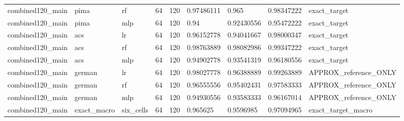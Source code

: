 \begin{tabular}{lllllllll}
combined120\_main & pima & rf & 64 & 120 & 0.97486111 & 0.965 & 0.98347222 & exact\_target \\
combined120\_main & pima & mlp & 64 & 120 & 0.94 & 0.92430556 & 0.95472222 & exact\_target \\
combined120\_main & acs & lr & 64 & 120 & 0.96152778 & 0.94041667 & 0.98000347 & exact\_target \\
combined120\_main & acs & rf & 64 & 120 & 0.98763889 & 0.98082986 & 0.99347222 & exact\_target \\
combined120\_main & acs & mlp & 64 & 120 & 0.94902778 & 0.93541319 & 0.96180556 & exact\_target \\
combined120\_main & german & lr & 64 & 120 & 0.98027778 & 0.96388889 & 0.99263889 & APPROX\_reference\_ONLY \\
combined120\_main & german & rf & 64 & 120 & 0.96555556 & 0.95402431 & 0.97583333 & APPROX\_reference\_ONLY \\
combined120\_main & german & mlp & 64 & 120 & 0.94930556 & 0.93583333 & 0.96167014 & APPROX\_reference\_ONLY \\
combined120\_main & exact\_macro & six\_cells & 64 & 120 & 0.965625 & 0.9596985 & 0.97094965 & exact\_target\_macro \\
\bottomrule
\end{tabular}
